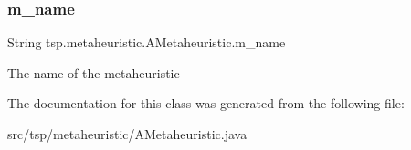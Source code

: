 \subsubsection{\texorpdfstring{m\+\_\+name}{m\_name}}
{\footnotesize\ttfamily String tsp.\+metaheuristic.\+A\+Metaheuristic.\+m\+\_\+name\hspace{0.3cm}{\ttfamily [protected]}}

The name of the metaheuristic 

The documentation for this class was generated from the following file\+:\begin{DoxyCompactItemize}
\item 
src/tsp/metaheuristic/A\+Metaheuristic.\+java\end{DoxyCompactItemize}
